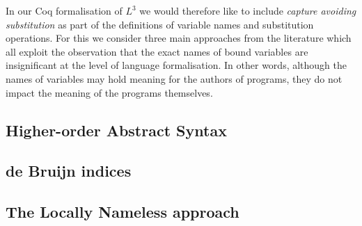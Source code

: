 \documentclass[]{unswthesis}
\begin{document}
In our Coq formalisation of $L^3$ we would therefore like to include \textit{capture avoiding substitution} as part of the definitions of variable names and substitution operations. For this we consider three main approaches from the literature which all exploit the observation that the exact names of bound variables are insignificant at the level of language formalisation. In other words, although the names of variables may hold meaning for the authors of programs, they do not impact the meaning of the programs themselves.

\subsection{Higher-order Abstract Syntax}

\subsection{de Bruijn indices}

\subsection{The Locally Nameless approach}



%
%
%
%
%

\backmatter



%
%
\end{document}

